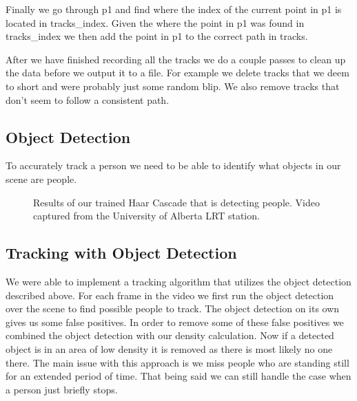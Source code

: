 \documentclass[12pt, onecolumn, conference]{IEEEtran}
\begin{document}
Finally we go through p1 and find where the index of the current point in p1 is located in tracks\_index. Given the where the point in p1 was found in tracks\_index we then add the point in p1 to the correct path in tracks.

After we have finished recording all the tracks we do a couple passes to clean up the data before we output it to a file. For example we delete tracks that we deem to short and were probably just some random blip. We also remove tracks that don’t seem to follow a consistent path.

\subsection{Object Detection}

To accurately track a person we need to be able to identify what objects in our scene are people.

\begin{figure}[!t]
\centering
\centering
{}
\hfil
{}
\caption{Results of our trained Haar Cascade that is detecting people. Video captured from the University of Alberta LRT station.}
\label{Object_Detection}
\end{figure}

\subsection{Tracking with Object Detection}

We were able to implement a tracking algorithm that utilizes the object detection described above. For each frame in the video we first run the object detection over the scene to find possible people to track. The object detection on its own gives us some false positives. In order to remove some of these false positives we combined the object detection with our density calculation. Now if a detected object is in an area of low density it is removed as there is most likely no one there. The main issue with this approach is we miss people who are standing still for an extended period of time. That being said we can still handle the case when a person just briefly stops.
\end{document}
